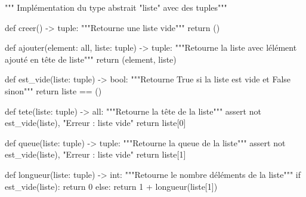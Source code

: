 \documentclass[
  letterpaper,
  DIV=11,
  numbers=noendperiod]{scrartcl}
\newenvironment{Shaded}{\begin{snugshade}}{\end{snugshade}}
\newcommand{\BuiltInTok}[1]{\textcolor[rgb]{0.00,0.23,0.31}{#1}}
\newcommand{\CommentTok}[1]{\textcolor[rgb]{0.37,0.37,0.37}{#1}}
\newcommand{\ControlFlowTok}[1]{\textcolor[rgb]{0.00,0.23,0.31}{#1}}
\newcommand{\DecValTok}[1]{\textcolor[rgb]{0.68,0.00,0.00}{#1}}
\newcommand{\KeywordTok}[1]{\textcolor[rgb]{0.00,0.23,0.31}{#1}}
\newcommand{\NormalTok}[1]{\textcolor[rgb]{0.00,0.23,0.31}{#1}}
\newcommand{\OperatorTok}[1]{\textcolor[rgb]{0.37,0.37,0.37}{#1}}
\newcommand{\StringTok}[1]{\textcolor[rgb]{0.13,0.47,0.30}{#1}}
\begin{document}
\begin{Shaded}
\begin{Highlighting}[]
\CommentTok{""" Implémentation du type abstrait "liste" avec des tuples"""}


\KeywordTok{def}\NormalTok{ creer() }\OperatorTok{{-}\textgreater{}} \BuiltInTok{tuple}\NormalTok{:}
    \CommentTok{"""Retourne une liste vide"""}
    \ControlFlowTok{return}\NormalTok{ ()}


\KeywordTok{def}\NormalTok{ ajouter(element: }\BuiltInTok{all}\NormalTok{, liste: }\BuiltInTok{tuple}\NormalTok{) }\OperatorTok{{-}\textgreater{}} \BuiltInTok{tuple}\NormalTok{:}
    \CommentTok{"""Retourne la liste avec l\textquotesingle{}élément ajouté en tête de liste"""}
    \ControlFlowTok{return}\NormalTok{ (element, liste)}


\KeywordTok{def}\NormalTok{ est\_vide(liste: }\BuiltInTok{tuple}\NormalTok{) }\OperatorTok{{-}\textgreater{}} \BuiltInTok{bool}\NormalTok{:}
    \CommentTok{"""Retourne True si la liste est vide et False sinon"""}
    \ControlFlowTok{return}\NormalTok{ liste }\OperatorTok{==}\NormalTok{ ()}


\KeywordTok{def}\NormalTok{ tete(liste: }\BuiltInTok{tuple}\NormalTok{) }\OperatorTok{{-}\textgreater{}} \BuiltInTok{all}\NormalTok{:}
    \CommentTok{"""Retourne la tête de la liste"""}
    \ControlFlowTok{assert} \KeywordTok{not}\NormalTok{ est\_vide(liste), }\StringTok{"Erreur : liste vide"}
    \ControlFlowTok{return}\NormalTok{ liste[}\DecValTok{0}\NormalTok{]}


\KeywordTok{def}\NormalTok{ queue(liste: }\BuiltInTok{tuple}\NormalTok{) }\OperatorTok{{-}\textgreater{}} \BuiltInTok{tuple}\NormalTok{:}
    \CommentTok{"""Retourne la queue de la liste"""}
    \ControlFlowTok{assert} \KeywordTok{not}\NormalTok{ est\_vide(liste), }\StringTok{"Erreur : liste vide"}
    \ControlFlowTok{return}\NormalTok{ liste[}\DecValTok{1}\NormalTok{]}


\KeywordTok{def}\NormalTok{ longueur(liste: }\BuiltInTok{tuple}\NormalTok{) }\OperatorTok{{-}\textgreater{}} \BuiltInTok{int}\NormalTok{:}
    \CommentTok{"""Retourne le nombre d\textquotesingle{}éléments de la liste"""}
    \ControlFlowTok{if}\NormalTok{ est\_vide(liste):}
        \ControlFlowTok{return} \DecValTok{0}
    \ControlFlowTok{else}\NormalTok{:}
        \ControlFlowTok{return} \DecValTok{1} \OperatorTok{+}\NormalTok{ longueur(liste[}\DecValTok{1}\NormalTok{])}
\end{Highlighting}
\end{Shaded}
\end{document}
